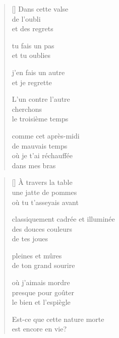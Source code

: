 \documentclass[12pt,a4paper]{article}
\begin{document}
\begin{verse}[\versewidth]
  Dans cette valse \\
  de l'oubli \\
  et des regrets

  tu fais un pas \\
  et tu oublies

  j'en fais un autre \\
  et je regrette

  L'un contre l'autre \\
  cherchons \\
  le troisième temps

  comme cet après-midi \\
  de mauvais temps \\
  où je t'ai réchauffée \\
  dans mes bras
\end{verse}


\newpage

\poemtitle{}

\settowidth{\versewidth}{classiquement cadrée et illuminée}

\bigskip

\begin{verse}[\versewidth]
  À travers la table \\
  une jatte de pommes \\
  où tu t'asseyais avant

  classiquement cadrée et illuminée \\
  des douces couleurs \\
  de tes joues

  pleines et mûres \\
  de ton grand sourire

  où j'aimais mordre \\
  presque pour goûter \\
  le bien et l'espiègle

  Est-ce que cette nature morte \\
  est encore en vie?
\end{verse}
\end{document}
